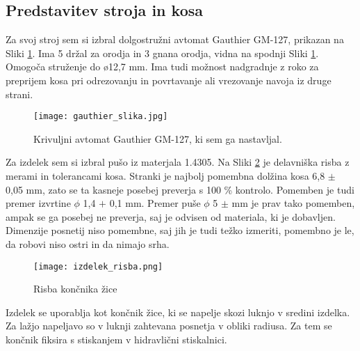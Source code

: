 \subsection{Predstavitev stroja in kosa}
Za svoj stroj sem si izbral dolgostružni avtomat Gauthier GM-127,
prikazan na Sliki \ref{gauthier_priblizano}.
Ima 5 držal za orodja in 3 gnana orodja, vidna na spodnji
Sliki \ref{gauthier_priblizano}. Omogoča struženje do ø12,7 mm.
Ima tudi možnost nadgradnje z roko za preprijem kosa pri odrezovanju in
povrtavanje ali vrezovanje navoja iz druge strani.

\begin{figure}[H]
	\begin{center}
		\texttt{[image: gauthier\_slika.jpg]}
		\caption{Krivuljni avtomat Gauthier GM-127, ki sem ga nastavljal.
			\cite{interna}}
		\label{gauthier_priblizano}
	\end{center}
\end{figure}

Za izdelek sem si izbral pušo iz materjala 1.4305.
Na Sliki \ref{delavniska_risba} je delavniška risba z
merami in tolerancami kosa. Stranki je najbolj pomembna dolžina
kosa 6,8 \(\pm\) 0,05 mm, zato se ta kasneje posebej preverja s
100 \% kontrolo. Pomemben je tudi premer izvrtine \(\phi\) 1,4 \(+\) 0,1 mm.
Premer puše \(\phi\) 5 \(\pm\) mm je prav tako pomemben, ampak se ga
posebej ne preverja, saj je odvisen od materiala, ki je dobavljen.
Dimenzije posnetij niso pomembne, saj jih je tudi težko izmeriti,
pomembno je le, da robovi niso ostri in da nimajo srha.

\begin{figure}[H]
	\begin{center}
		\texttt{[image: izdelek\_risba.png]}
		\caption{Risba končnika žice
			\cite{interna}}
		\label{delavniska_risba}
	\end{center}
\end{figure}

Izdelek se uporablja kot končnik žice, ki se napelje skozi
luknjo v sredini izdelka. Za lažjo napeljavo so v luknji zahtevana
posnetja v obliki radiusa. Za tem se končnik fiksira s
stiskanjem v hidravlični stiskalnici.